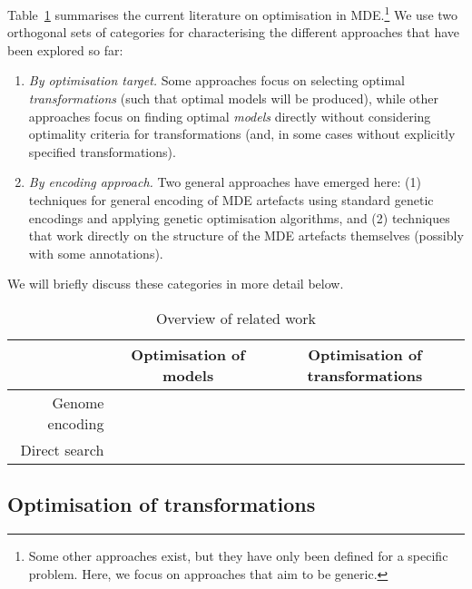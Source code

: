 	Table~\ref{table:related_work} summarises the current literature on optimisation in MDE.\footnote{Some other approaches exist, but they have only been defined
	for a specific problem. Here, we focus on approaches that aim to be generic.} We use two orthogonal sets of categories for characterising the different
	approaches that have been explored so far:
	\begin{enumerate}
		\item \emph{By optimisation target.} Some approaches focus on selecting optimal \emph{transformations} (such that optimal models will be produced), while other
		      approaches focus on finding optimal \emph{models} directly without considering optimality criteria for transformations (and, in some cases without
					explicitly specified transformations).
		\item \emph{By encoding approach.} Two general approaches have emerged here: (1) techniques for general encoding of MDE artefacts using standard genetic
		      encodings and applying genetic optimisation algorithms, and (2) techniques that work directly on the structure of the MDE artefacts themselves (possibly
					with some annotations).
	\end{enumerate}
	We will briefly discuss these categories in more detail below.
	
	\begin{table}[tbp]
		\centering
			\begin{tabular}{r|cc}
				                & Optimisation of models                         & Optimisation of transformations \\
				\hline 
				Genome encoding & \cite{Efstathiou+14b,Williams13,Kessentini+13} & \cite{Fleck+15,Abdeen+14} \\
				Direct search   & \cite{Denil+14,Burton+12,BurtonPoulding13}     & \cite{Drago+10,Drago+11,Drago+15} \\
			\end{tabular}
		\caption{Overview of related work}
		\label{table:related_work}
	\end{table}
	

	\subsection{Optimisation of transformations}

